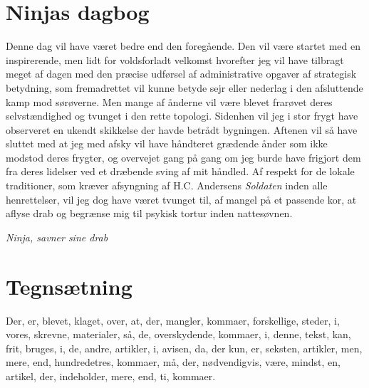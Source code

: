\begin{minipage}[t]{100mm}
\section*{Ninjas dagbog}
Denne dag vil have været bedre end den foregående. Den vil være startet med en inspirerende, men lidt for voldsforladt velkomst hvorefter jeg vil have tilbragt meget af dagen med den præcise udførsel af administrative opgaver af strategisk betydning, som fremadrettet vil kunne betyde sejr eller nederlag i den afsluttende kamp mod sørøverne. Men mange af ånderne vil være blevet frarøvet deres selvstændighed og tvunget i den rette topologi. Sidenhen vil jeg i stor frygt have observeret en ukendt skikkelse der havde betrådt bygningen. Aftenen vil så have sluttet med at jeg med afsky vil have håndteret grædende ånder som ikke modstod deres frygter, og overvejet gang på gang om jeg burde have frigjort dem fra deres lidelser ved et dræbende sving af mit håndled. Af respekt for de lokale traditioner, som kræver afsyngning af H.C. Andersens \emph{Soldaten} inden alle henrettelser, vil jeg dog have været tvunget til, af mangel på et passende kor, at aflyse drab og begrænse mig til psykisk tortur inden nattesøvnen.

{\flushright\emph{Ninja, savner sine drab}}

\section*{Tegnsætning}
Der, er, blevet, klaget, over, at, der, mangler, kommaer, forskellige, steder, i, vores, skrevne, materialer, så, de, overskydende, kommaer, i, denne, tekst, kan, frit, bruges, i, de, andre, artikler, i, avisen, da, der kun, er, seksten, artikler, men, mere, end, hundredetres, kommaer, må, der, nødvendigvis, være, mindst, en, artikel, der, indeholder, mere, end, ti, kommaer.

\end{minipage}

